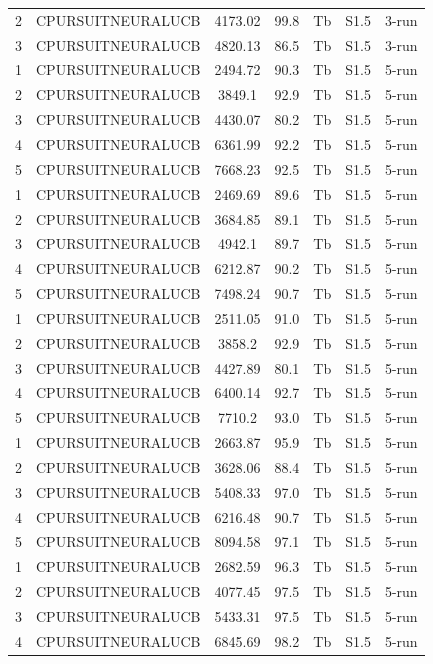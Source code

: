 \documentclass[11pt]{article}
\begin{document}
\begin{center}
\begin{longtable}{|c|c|c|c|c|c|c|}
2 & CPURSUITNEURALUCB & 4173.02 & 99.8 & Tb & S1.5 & 3-run \\
3 & CPURSUITNEURALUCB & 4820.13 & 86.5 & Tb & S1.5 & 3-run \\
1 & CPURSUITNEURALUCB & 2494.72 & 90.3 & Tb & S1.5 & 5-run \\
2 & CPURSUITNEURALUCB & 3849.1 & 92.9 & Tb & S1.5 & 5-run \\
3 & CPURSUITNEURALUCB & 4430.07 & 80.2 & Tb & S1.5 & 5-run \\
4 & CPURSUITNEURALUCB & 6361.99 & 92.2 & Tb & S1.5 & 5-run \\
5 & CPURSUITNEURALUCB & 7668.23 & 92.5 & Tb & S1.5 & 5-run \\
1 & CPURSUITNEURALUCB & 2469.69 & 89.6 & Tb & S1.5 & 5-run \\
2 & CPURSUITNEURALUCB & 3684.85 & 89.1 & Tb & S1.5 & 5-run \\
3 & CPURSUITNEURALUCB & 4942.1 & 89.7 & Tb & S1.5 & 5-run \\
4 & CPURSUITNEURALUCB & 6212.87 & 90.2 & Tb & S1.5 & 5-run \\
5 & CPURSUITNEURALUCB & 7498.24 & 90.7 & Tb & S1.5 & 5-run \\
1 & CPURSUITNEURALUCB & 2511.05 & 91.0 & Tb & S1.5 & 5-run \\
2 & CPURSUITNEURALUCB & 3858.2 & 92.9 & Tb & S1.5 & 5-run \\
3 & CPURSUITNEURALUCB & 4427.89 & 80.1 & Tb & S1.5 & 5-run \\
4 & CPURSUITNEURALUCB & 6400.14 & 92.7 & Tb & S1.5 & 5-run \\
5 & CPURSUITNEURALUCB & 7710.2 & 93.0 & Tb & S1.5 & 5-run \\
1 & CPURSUITNEURALUCB & 2663.87 & 95.9 & Tb & S1.5 & 5-run \\
2 & CPURSUITNEURALUCB & 3628.06 & 88.4 & Tb & S1.5 & 5-run \\
3 & CPURSUITNEURALUCB & 5408.33 & 97.0 & Tb & S1.5 & 5-run \\
4 & CPURSUITNEURALUCB & 6216.48 & 90.7 & Tb & S1.5 & 5-run \\
5 & CPURSUITNEURALUCB & 8094.58 & 97.1 & Tb & S1.5 & 5-run \\
1 & CPURSUITNEURALUCB & 2682.59 & 96.3 & Tb & S1.5 & 5-run \\
2 & CPURSUITNEURALUCB & 4077.45 & 97.5 & Tb & S1.5 & 5-run \\
3 & CPURSUITNEURALUCB & 5433.31 & 97.5 & Tb & S1.5 & 5-run \\
4 & CPURSUITNEURALUCB & 6845.69 & 98.2 & Tb & S1.5 & 5-run \\

\end{longtable}
\end{center}
\end{document}
